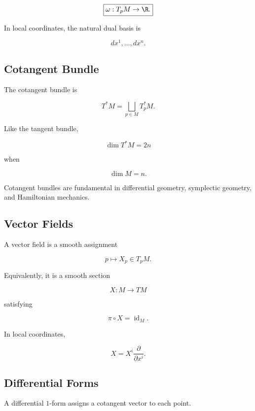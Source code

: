 \[
\boxed{
\omega:T_pM\to\R.
}
\]

In local coordinates, the natural dual basis is

\[
\boxed{
dx^1,\ldots,dx^n.
}
\]

\subsection{Cotangent Bundle}
\label{subsec:cotangent-bundle-manifolds}

The cotangent bundle is

\[
\boxed{
T^*M
=
\bigsqcup_{p\in M}T_p^*M.
}
\]

Like the tangent bundle,

\[
\boxed{
\dim T^*M=2n
}
\]

when

\[
\dim M=n.
\]

Cotangent bundles are fundamental in differential geometry, symplectic
geometry, and Hamiltonian mechanics.

\subsection{Vector Fields}
\label{subsec:vector-fields-manifolds}

A vector field is a smooth assignment

\[
\boxed{
p\mapsto X_p\in T_pM.
}
\]

Equivalently, it is a smooth section

\[
X:M\to TM
\]

satisfying

\[
\boxed{
\pi\circ X=\operatorname{id}_M.
}
\]

In local coordinates,

\[
\boxed{
X
=
X^i
\frac{\partial}{\partial x^i}.
}
\]

\subsection{Differential Forms}
\label{subsec:differential-forms-manifolds}

A differential \(1\)-form assigns a cotangent vector to each point.

